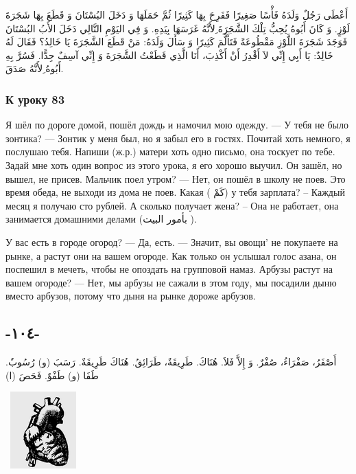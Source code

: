 \documentclass[a5paper]{article}
\begin{document}
أَعْطَى رَجُلٌ وَلَدَهُ فَأْسًا صَغِيرًا فَفَرِحَ بِهَا كَثِيرًا ثُمَّ حَمَلَهَا وَ دَخَلَ البُسْتَانَ وَ قَطَعَ بِهَا شَجَرَةَ لَوْزٍ. وَ كَانَ أَبُوهُ يُحِبُّ تِلْكَ الشَّجَرَةَ ِلأَنَّهُ غَرَسَهَا بِيَدِهِ. وَ فِي اليَوْمِ التَّالِي دَخَلَ الأَبُ البُسْتَانَ فَوَجَدَ شَجَرَةَ اللَّوْزِ مَقْطُوعَةً فَتَأَلَّمَ كَثِيرًا وَ سَأَلَ وَلَدَهُ: مَنْ قَطَعَ الشَّجَرَةَ يَا خَالِدُ؟ فَقَالَ لَهُ خَالِدٌ: يَا أَبِي إِنِّي لاَ أَقْدِرُ أَنْ أَكْذِبَ، أَنَا الَّذِي قَطَعْتُ الشَّجَرَةَ وَ إِنِّي آسِفٌ جِدًّا. فَسُرَّ بِهِ أَبُوهُ ِلأَنَّهُ صَدَقَ.

\subsubsection{К уроку 83}
Я шёл по дороге домой, пошёл дождь и намочил мою одежду. — У тебя не было зонтика? — Зонтик у меня был, но я забыл его в гостях. Почитай хоть немного, я послушаю тебя. Напиши (ж.р.) матери хоть одно письмо, она тоскует по тебе. Задай мне хоть один вопрос из этого урока, я его хорошо выучил. Он зашёл, но вышел, не присев. Мальчик поел утром? — Нет, он пошёл в школу не поев. Это время обеда, не выходи из дома не поев. Какая ( كَمْ) у тебя зарплата? – Каждый месяц я получаю сто рублей. А сколько получает жена? – Она не работает, она занимается домашними делами (بأمور البيت ).

У вас есть в городе огород? — Да, есть. — Значит, вы овощи' не покупаете на рынке, а растут они на вашем огороде. Как только он услышал голос азана, он поспешил в мечеть, чтобы не опоздать на групповой намаз. Арбузы растут на вашем огороде? — Нет, мы арбузы не сажали в этом году, мы посадили дыню вместо арбузов, потому что дыня на рынке дороже арбузов.

\subsection[-١٠٤-]{-١٠٤-}
أَصْفَرُ، صَفْرَاءُ، صُفْرٌ. وَ إِلاَّ فَلاَ. هُنَاكَ. طَرِيقَةٌ، طَرَائِقُ. هُنَاكَ طَرِيقَةٌ. رَسَبَ (و) رُسُوبٌ. طَفَا (و) طَفْوٌ. فَحَصَ (ا) 

\  \includegraphics[width=1in,height=1.1665in]{images/MuhammadBagauddinprettified-img277.png} 
\end{document}
